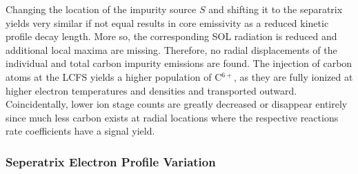                 Changing the location of the impurity source $S$ and shifting it to the separatrix yields very similar if not equal results in core emissivity as a reduced kinetic profile decay length. More so, the corresponding SOL radiation is reduced and additional local maxima are missing. Therefore, no radial displacements of the individual and total carbon impurity emissions are found. The injection of carbon atoms at the LCFS yields a higher population of C$^{6+}$, as they are fully ionized at higher electron temperatures and densities and transported outward. Coincidentally, lower ion stage counts are greatly decreased or disappear entirely since much less carbon exists at radial locations where the respective reactions rate coefficients have a signal yield.%
%
            \subsubsection*{Seperatrix Electron Profile Variation}%
%
                \begin{figure}[t]%
                    \centering%
                    \begin{minipage}[b]{0.48\textwidth}%
                        \centering%
                    \end{minipage}%
                    \hfill%
                    \begin{minipage}[b]{0.48\textwidth}%
                        \centering%
                    \end{minipage}%
                    \label{fig:nete_abund_82_90}%
                \end{figure}%
